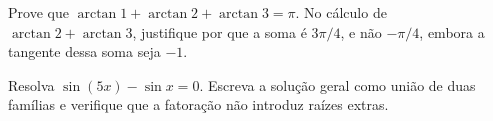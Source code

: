\documentclass[11pt,a4paper]{article}
\begin{document}
\begin{exercicio}
Prove que $\arctan 1+\arctan 2+\arctan 3=\pi$. No cálculo de $\arctan 2+\arctan 3$, justifique por que a soma é $3\pi/4$, e não $-\pi/4$, embora a tangente dessa soma seja $-1$.
\end{exercicio}

\begin{exercicio}
Resolva $\sin(5x)-\sin x=0$. Escreva a solução geral como união de duas famílias e verifique que a fatoração não introduz raízes extras.
\end{exercicio}
\end{document}
